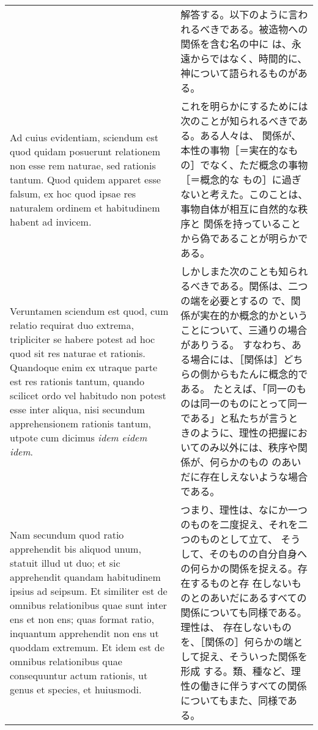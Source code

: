 \documentclass[10pt]{jsarticle} %
\begin{document}
\begin{longtable}{p{21em}p{21em}}
&

解答する。以下のように言われるべきである。被造物への関係を含む名の中に
は、永遠からではなく、時間的に、神について語られるものがある。

\\


Ad cuius evidentiam, sciendum est quod quidam posuerunt
 relationem non esse rem naturae, sed rationis tantum. Quod quidem
 apparet esse falsum, ex hoc quod ipsae res naturalem ordinem et
 habitudinem habent ad invicem. 

&

これを明らかにするためには次のことが知られるべきである。ある人々は、
関係が、本性の事物［＝実在的なもの］でなく、ただ概念の事物［＝概念的な
もの］に過ぎないと考えた。このことは、事物自体が相互に自然的な秩序と
関係を持っていることから偽であることが明らかである。

\\


Veruntamen sciendum est quod, cum relatio requirat duo extrema,
tripliciter se habere potest ad hoc quod sit res naturae et
rationis. Quandoque enim ex utraque parte est res rationis tantum,
quando scilicet ordo vel habitudo non potest esse inter aliqua, nisi
secundum apprehensionem rationis tantum, utpote cum dicimus {\itshape
idem eidem idem}. 

&

しかしまた次のことも知られるべきである。関係は、二つの端を必要とするの
で、関係が実在的か概念的かということについて、三通りの場合がありうる。
すなわち、ある場合には、［関係は］どちらの側からもたんに概念的である。
たとえば、「同一のものは同一のものにとって同一である」と私たちが言うと
きのように、理性の把握においてのみ以外には、秩序や関係が、何らかのもの
のあいだに存在しえないような場合である。

\\

Nam secundum quod ratio apprehendit bis aliquod
unum, statuit illud ut duo; et sic apprehendit quandam habitudinem
ipsius ad seipsum. Et similiter est de omnibus relationibus quae sunt
inter ens et non ens; quas format ratio, inquantum apprehendit non ens
ut quoddam extremum. Et idem est de omnibus relationibus quae
consequuntur actum rationis, ut genus et species, et huiusmodi.


&


つまり、理性は、なにか一つのものを二度捉え、それを二つのものとして立て、
そうして、そのものの自分自身への何らかの関係を捉える。存在するものと存
在しないものとのあいだにあるすべての関係についても同様である。理性は、
存在しないものを、［関係の］何らかの端として捉え、そういった関係を形成
する。類、種など、理性の働きに伴うすべての関係についてもまた、同様であ
る。



\end{longtable}
\end{document}

